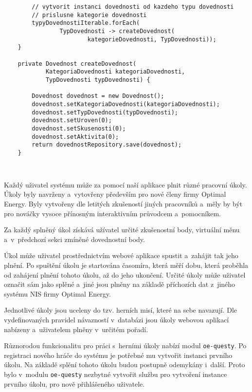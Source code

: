 \documentclass[12pt]{article}
\begin{document}
{\begin{lstlisting}
        // vytvorit instanci dovednosti od kazdeho typu dovednosti
        // prislusne kategorie dovednosti
        typyDovednostiIterable.forEach(
                TypDovednosti -> createDovednost(
                        kategorieDovednosti, TypDovednosti));
    }
    
    private Dovednost createDovednost(
            KategoriaDovednosti kategoriaDovednosti,
            TypDovednosti typDovednosti) {

        Dovednost dovednost = new Dovednost();
        dovednost.setKategoriaDovednosti(kategoriaDovednosti);
        dovednost.setTypDovednosti(typDovednosti);
        dovednost.setUroven(0);
        dovednost.setSkusenosti(0);
        dovednost.setAktivita(0);
        return dovednostRepository.save(dovednost);
    }

    
\end{lstlisting}

\clearpage


Každý uživatel systému může za pomocí naší aplikace plnit různé pracovní úkoly.
Úkoly byly navrženy a~vytovřeny především pro nové členy firmy Optimal Energy. 
Byly vytvořeny dle letitých zkušeností jiných pracovníků 
a~měly by být pro nováčky vysoce přínosným interaktivním průvodcem a~pomocníkem.

Za každý splněný úkol získává užívatel určité zkušenostní body, 
virtuální měnu a~v~předchozí sekci zmíněné dovednostní body. 

Úkol může uživatel prostřednictvím webové aplikace spustit a~zahájit tak jeho plnění. 
Po spuštění úkolu je startována časomíra, která měří dobu, 
která proběhla od zahájení plnění tohoto úkolu, až do jeho ukončení. 
Určité úkoly může uživatel označit sám jako splěné 
a~jiné jsou plněny na základě příchozích dat z~jiného systému NIS firmy Optimal Energy. 

Jednotlivé úkoly jsou uceleny do tzv. herních misí, které na sebe navazují. 
Dle vydefinovaných pravidel návazností v~databázi jsou úkoly webovou aplikací nabízeny 
a~uživatelem plněny v~určitém pořadí.

Různorodou funkcionalitu pro práci s~herními úkoly nabízí modul \texttt{oe-questy}.
Po registraci nového hráče do systému je potřebné mu vytvořit instanci prvního úkolu. 
Na základě splění tohoto úkolu budou postupně odemykány i~další. 
Proto bylo v~modulu \texttt{oe-questy} nezbytné vytvořit službu pro vytvoření instance prvního úkolu, 
pro nově přihlášeného uživatele. 

}
\end{document}
